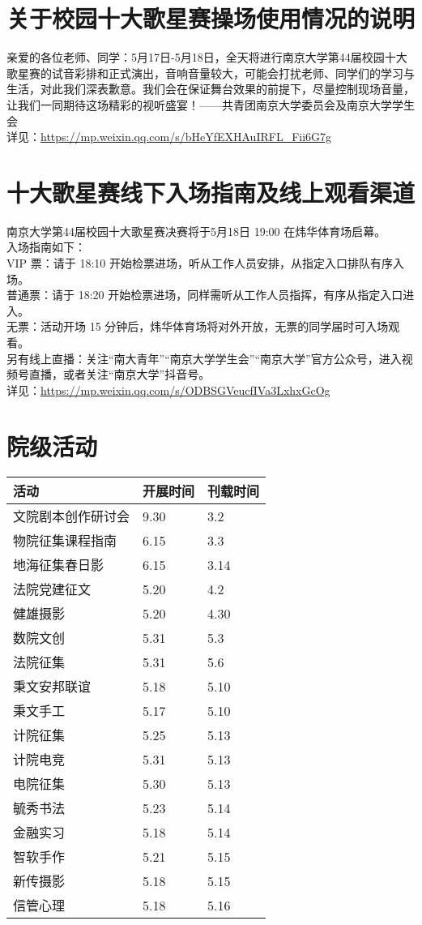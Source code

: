 \documentclass[letterpaper, 12pt]{article}
\begin{document}
\begin{multicols}{2}
\section{关于校园十大歌星赛操场使用情况的说明} %
亲爱的各位老师、同学：5月17日-5月18日，全天将进行南京大学第44届校园十大歌星赛的试音彩排和正式演出，音响音量较大，可能会打扰老师、同学们的学习与生活，对此我们深表歉意。我们会在保证舞台效果的前提下，尽量控制现场音量，让我们一同期待这场精彩的视听盛宴！——共青团南京大学委员会及南京大学学生会
\\详见：\url{https://mp.weixin.qq.com/s/bHeYfEXHAuIRFL_Fii6G7g}

\section{十大歌星赛线下入场指南及线上观看渠道} %
南京大学第44届校园十大歌星赛决赛将于5月18日 19:00 在炜华体育场启幕。
\\入场指南如下：
\\VIP 票：请于 18:10 开始检票进场，听从工作人员安排，从指定入口排队有序入场。
\\普通票：请于 18:20 开始检票进场，同样需听从工作人员指挥，有序从指定入口进入。
\\无票：活动开场 15 分钟后，炜华体育场将对外开放，无票的同学届时可入场观看。
\\另有线上直播：关注“南大青年”“南京大学学生会”“南京大学”官方公众号，进入视频号直播，或者关注“南京大学”抖音号。
\\详见：\url{https://mp.weixin.qq.com/s/ODBSGVeucfIVa3LxhxGcOg}
\section{院级活动}
\begin{tabular}{|>{\centering\arraybackslash}m{}|m{}|m{}|}
\hline
    活动 & 开展时间 & 刊载时间\\
    \hline\hline
    文院剧本创作研讨会 & 9.30 & 3.2\\
    物院征集课程指南 & 6.15 & 3.3\\
    地海征集春日影 & 6.15 & 3.14\\
    法院党建征文 & 5.20 & 4.2\\
    健雄摄影 & 5.20 & 4.30\\
    数院文创 & 5.31 & 5.3\\
    法院征集 & 5.31 & 5.6\\
    秉文安邦联谊 & 5.18 & 5.10\\
    秉文手工 & 5.17 & 5.10\\
    计院征集 & 5.25 & 5.13\\
    计院电竞 & 5.31 & 5.13\\
    电院征集 & 5.30 & 5.13\\
    毓秀书法 & 5.23 & 5.14\\
    金融实习 & 5.18 & 5.14\\
    智软手作 & 5.21 & 5.15\\
    新传摄影 & 5.18 & 5.15\\
    信管心理 & 5.18 & 5.16\\
    

\end{tabular}
\end{multicols}
\end{document}

